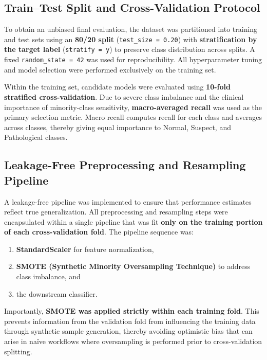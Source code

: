 \documentclass[sigconf]{acmart}
\begin{document}
\subsection{Train--Test Split and Cross-Validation Protocol}
\label{subsec:split}

To obtain an unbiased final evaluation, the dataset was partitioned into training and test sets using an \textbf{80/20 split} (\texttt{test\_size = 0.20}) with \textbf{stratification by the target label} (\texttt{stratify = y}) to preserve class distribution across splits. A fixed \texttt{random\_state = 42} was used for reproducibility. All hyperparameter tuning and model selection were performed exclusively on the training set.

Within the training set, candidate models were evaluated using \textbf{10-fold stratified cross-validation}. Due to severe class imbalance and the clinical importance of minority-class sensitivity, \textbf{macro-averaged recall} was used as the primary selection metric. Macro recall computes recall for each class and averages across classes, thereby giving equal importance to Normal, Suspect, and Pathological classes.

\subsection{Leakage-Free Preprocessing and Resampling Pipeline}
\label{subsec:pipeline}

A leakage-free pipeline was implemented to ensure that performance estimates reflect true generalization. All preprocessing and resampling steps were encapsulated within a single pipeline that was fit \textbf{only on the training portion of each cross-validation fold}. The pipeline sequence was:

\begin{enumerate}
    \item \textbf{StandardScaler} for feature normalization,
    \item \textbf{SMOTE (Synthetic Minority Oversampling Technique)} \cite{chawla2002} to address class imbalance, and
    \item the downstream classifier.
\end{enumerate}

Importantly, \textbf{SMOTE was applied strictly within each training fold}. This prevents information from the validation fold from influencing the training data through synthetic sample generation, thereby avoiding optimistic bias that can arise in naïve workflows where oversampling is performed prior to cross-validation splitting.
\end{document}
